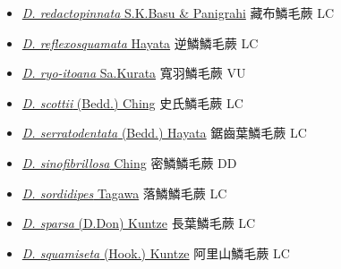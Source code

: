\begin{itemize}
\begin{itemize}
        \item[] \href{http://www.theplantlist.org/tpl1.1/search?q=Dryopteris+redactopinnata}{\textit{D. redactopinnata} S.K.Basu \& Panigrahi}   藏布鱗毛蕨 LC
        \item[] \href{http://www.theplantlist.org/tpl1.1/search?q=Dryopteris+reflexosquamata}{\textit{D. reflexosquamata} Hayata}   逆鱗鱗毛蕨 LC
        \item[] \href{http://www.theplantlist.org/tpl1.1/search?q=Dryopteris+ryo-itoana}{\textit{D. ryo-itoana} Sa.Kurata}   寬羽鱗毛蕨 VU
        \item[] \href{http://www.theplantlist.org/tpl1.1/search?q=Dryopteris+scottii}{\textit{D. scottii} (Bedd.) Ching}   史氏鱗毛蕨 LC
        \item[] \href{http://www.theplantlist.org/tpl1.1/search?q=Dryopteris+serratodentata}{\textit{D. serratodentata} (Bedd.) Hayata}   鋸齒葉鱗毛蕨 LC
        \item[] \href{http://www.theplantlist.org/tpl1.1/search?q=Dryopteris+sinofibrillosa}{\textit{D. sinofibrillosa} Ching}     密鱗鱗毛蕨 DD
        \item[] \href{http://www.theplantlist.org/tpl1.1/search?q=Dryopteris+sordidipes}{\textit{D. sordidipes} Tagawa}   落鱗鱗毛蕨 LC
        \item[] \href{http://www.theplantlist.org/tpl1.1/search?q=Dryopteris+sparsa}{\textit{D. sparsa} (D.Don) Kuntze}   長葉鱗毛蕨 LC
        \item[] \href{http://www.theplantlist.org/tpl1.1/search?q=Dryopteris+squamiseta}{\textit{D. squamiseta} (Hook.) Kuntze}   阿里山鱗毛蕨 LC

\end{itemize}
\end{itemize}
